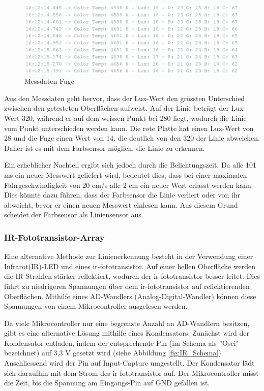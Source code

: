 \documentclass[../main.tex]{subfiles}
\begin{document}
\begin{figure}[H]
    \centering
    \includegraphics[width=\textwidth]{img/sensortest/MD_Fuge_101ms.png}
    \caption{Messdaten Fuge}
    \label{fig:MDFarbsensorFuge}
\end{figure}

Aus den Messdaten geht hervor, dass der Lux-Wert den grössten Unterschied zwischen den getesteten Oberflächen aufweist. Auf der Linie beträgt der Lux-Wert 320, während er auf dem weissen Punkt bei 280 liegt, wodurch die Linie vom Punkt unterschieden werden kann. Die rote Platte hat einen Lux-Wert von 28 und die Fuge einen Wert von 14, die deutlich von den 320 der Linie abweichen. Daher ist es mit dem Farbsensor möglich, die Linie zu erkennen.

Ein erheblicher Nachteil ergibt sich jedoch durch die Belichtungszeit. Da alle 101 ms ein neuer Messwert geliefert wird, bedeutet dies, dass bei einer maximalen Fahrgeschwindigkeit von 20 cm/s alle 2 cm ein neuer Wert erfasst werden kann. Dies könnte dazu führen, dass der Farbsensor die Linie verliert oder von ihr abweicht, bevor er einen neuen Messwert einlesen kann. Aus diesem Grund scheidet der Farbsensor als Liniensensor aus.

\newpage
\subsubsection{IR-Fototransistor-Array}
\label{a4:Infrarotfototransistor-Array}
Eine alternative Methode zur Linienerkennung besteht in der Verwendung einer Infrarot(IR)-LED und eines \gls{ir-fototransistor}. Auf einer hellen Oberfläche werden die IR-Strahlen stärker reflektiert, wodurch der \gls{ir-fototransistor} besser leitet. Dies führt zu niedrigeren Spannungen über dem \gls{ir-fototransistor} auf reflektierenden Oberflächen. Mithilfe eines AD-Wandlers (Analog-Digital-Wandler) können diese Spannungen von einem Mikrocontroller ausgelesen werden.

Da viele Mikrocontroller nur eine begrenzte Anzahl an AD-Wandlern besitzen, gibt es eine alternative Lösung mithilfe eines Kondensators. Zunächst wird der Kondensator entladen, indem der entsprechende Pin (im Schema als ''Osci" bezeichnet) auf 3,3 V gesetzt wird (siehe Abbildung \ref{fig:IR_Schema}). Anschliessend wird der Pin auf Input-Capture umgestellt. Der Kondensator lädt sich daraufhin mit dem Strom des \gls{ir-fototransistor} auf. Der Mikrocontroller misst die Zeit, bis die Spannung am Eingangs-Pin auf GND gefallen ist.
\end{document}
